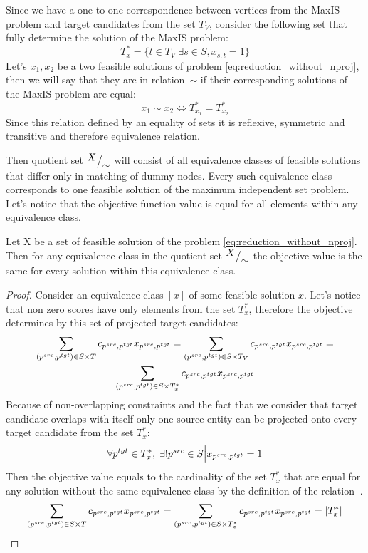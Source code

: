 Since we have a one to one correspondence between vertices from the MaxIS problem and target
candidates from the set \( T_V \), consider the following set that fully determine the solution of the
MaxIS problem:
\[
  T^*_{x} = \{ t \in T_V | \exists s \in S, x_{s, t} = 1 \}
\]
Let's \( x_1, x_2 \) be a two feasible solutions of problem \eqref{eq:reduction_without_nproj}, then we will say that
they are in relation~\( \sim \) if their corresponding solutions of the MaxIS problem are equal:
\[
  x_1 \sim x_2 \Leftrightarrow T^{*}_{x_1} = T^{*}_{x_2}
\]
Since this relation defined by an equality of sets it is reflexive, symmetric and transitive and therefore
equivalence relation.

Then quotient set \( {^{\textstyle X}\big/_{\textstyle \sim}} \) will consist of all equivalence classes of feasible solutions
that differ only in matching of dummy nodes. Every such equivalence class corresponds to one feasible solution of
the maximum independent set problem. Let's notice that the objective function value is equal for all
elements within any equivalence class.
\begin{lemma}
  Let X be a set of feasible solution of the problem \eqref{eq:reduction_without_nproj}. Then
  for any equivalence class in the quotient set \( {^{\textstyle X}\big/_{\textstyle \sim}} \) the objective
  value is the same for every solution within this equivalence class.
\end{lemma}
\begin{proof}
  Consider an equivalence class \( [x] \) of some feasible solution \( x \).
  Let's notice that non zero scores have only elements from the set \( T^*_x \),
  therefore the objective determines by this set of projected target candidates:
  \begin{multline*}
    \sum\limits_{(p^{src}, p^{tgt}) \in S \times T} c_{p^{src}, p^{tgt}} x_{p^{src}, p^{tgt}} =
    \sum\limits_{(p^{src}, p^{tgt}) \in S \times T_V} c_{p^{src}, p^{tgt}} x_{p^{src}, p^{tgt}} = \\
    \sum\limits_{(p^{src}, p^{tgt}) \in S \times T^{*}_{x}} c_{p^{src}, p^{tgt}} x_{p^{src}, p^{tgt}}
  \end{multline*}
  Because of non-overlapping constraints and the fact that we consider that target candidate overlaps with
  itself only one source entity can be projected onto every target candidate from the set \( T_x^* \):
  \[
    \forall p^{tgt} \in T^*_x, \; \exists! p^{src} \in S \Big| x_{p^{src}, p^{tgt}} = 1
  \]
  Then the objective value equals to the cardinality of the set \( T^*_x \) that are equal for
  any solution without the same equivalence class by the definition of the relation \( ~ \).
  \[
    \sum\limits_{(p^{src}, p^{tgt}) \in S \times T} c_{p^{src}, p^{tgt}} x_{p^{src}, p^{tgt}} =
    \sum\limits_{(p^{src}, p^{tgt}) \in S \times T^{*}_{x}} c_{p^{src}, p^{tgt}} x_{p^{src}, p^{tgt}} =
    |T_x^*|
  \]
\end{proof}
